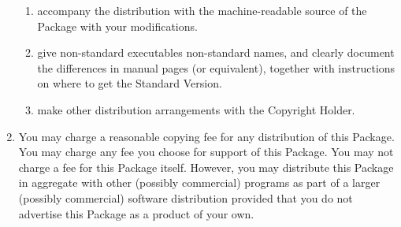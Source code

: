 \documentclass[a4paper]{article}
\begin{document}
\begin{enumerate}
\begin{enumerate}
    \item accompany the distribution with the machine-readable source of
    the Package with your modifications.

    \item give non-standard executables non-standard names, and clearly
    document the differences in manual pages (or equivalent), together
    with instructions on where to get the Standard Version.

    \item make other distribution arrangements with the Copyright Holder.
\end{enumerate}

\item You may charge a reasonable copying fee for any distribution of this
Package.  You may charge any fee you choose for support of this
Package.  You may not charge a fee for this Package itself.  However,
you may distribute this Package in aggregate with other (possibly
commercial) programs as part of a larger (possibly commercial) software
distribution provided that you do not advertise this Package as a
product of your own.








\end{enumerate}
\end{document}
